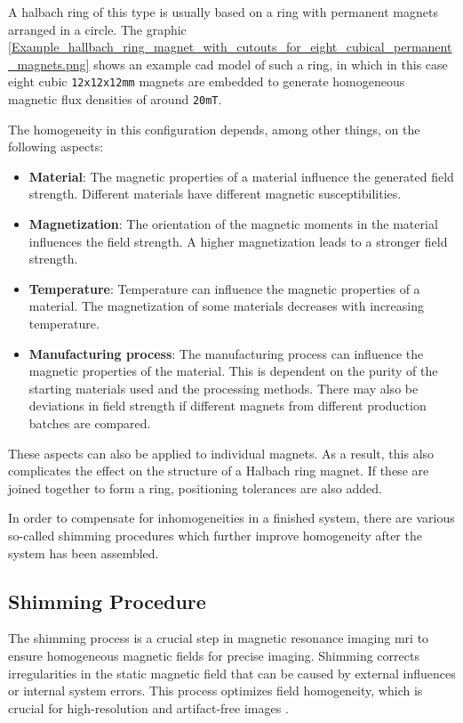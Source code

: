 A halbach ring of this type is usually based on a ring with permanent
magnets arranged in a circle. The graphic
\ref{Example_hallbach_ring_magnet_with_cutouts_for_eight_cubical_permanent_magnets.png}
shows an example \gls{cad} model of such a ring, in which in this case
eight cubic \passthrough{\lstinline!12x12x12mm!} magnets are embedded to
generate homogeneous magnetic flux densities of around
\passthrough{\lstinline!20mT!}.

The homogeneity in this configuration depends, among other things, on
the following aspects:

\begin{itemize}
\item
  \textbf{Material}: The magnetic properties of a material influence the
  generated field strength. Different materials have different magnetic
  susceptibilities.
\item
  \textbf{Magnetization}: The orientation of the magnetic moments in the
  material influences the field strength. A higher magnetization leads
  to a stronger field strength.
\item
  \textbf{Temperature}: Temperature can influence the magnetic
  properties of a material. The magnetization of some materials
  decreases with increasing temperature.
\item
  \textbf{Manufacturing process}: The manufacturing process can
  influence the magnetic properties of the material. This is dependent
  on the purity of the starting materials used and the processing
  methods. There may also be deviations in field strength if different
  magnets from different production batches are compared.
\end{itemize}

These aspects can also be applied to individual magnets. As a result,
this also complicates the effect on the structure of a Halbach ring
magnet. If these are joined together to form a ring, positioning
tolerances are also added.

In order to compensate for inhomogeneities in a finished system, there
are various so-called shimming procedures which further improve
homogeneity after the system has been assembled.

\hypertarget{shimming-procedure}{%
\subsection{Shimming Procedure}\label{shimming-procedure}}

The shimming process is a crucial step in magnetic resonance imaging
\gls{mri} to ensure homogeneous magnetic fields for precise imaging.
Shimming corrects irregularities in the static magnetic field that can
be caused by external influences or internal system errors. This process
optimizes field homogeneity, which is crucial for high-resolution and
artifact-free images \cite{10.3389/fphy.2021.704566}.

